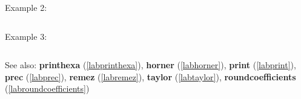 \noindent Example 2: 
\begin{center}\begin{minipage}{15cm}\begin{Verbatim}[frame=single]
\end{Verbatim}
\end{minipage}\end{center}
\noindent Example 3: 
\begin{center}\begin{minipage}{15cm}\begin{Verbatim}[frame=single]
\end{Verbatim}
\end{minipage}\end{center}
See also: \textbf{printhexa} (\ref{labprinthexa}), \textbf{horner} (\ref{labhorner}), \textbf{print} (\ref{labprint}), \textbf{prec} (\ref{labprec}), \textbf{remez} (\ref{labremez}), \textbf{taylor} (\ref{labtaylor}), \textbf{roundcoefficients} (\ref{labroundcoefficients})
